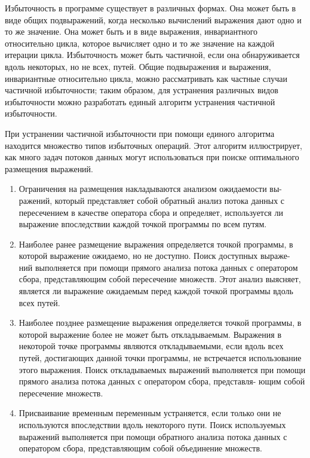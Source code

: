 
Избыточность в программе существует в различных формах. Она может быть в виде общих подвыражений, когда несколько вычислений выражения дают одно и то же значение. Она может быть и в виде выражения, инвариантного относительно цикла, которое вычисляет одно и то же значение на каждой итерации цикла. Избыточность может быть частичной, если она обнаруживается вдоль некоторых, но не всех, путей. Общие подвыражения и выражения, инвариантные относительно цикла, можно рассматривать как частные случаи частичной избыточности; таким образом, для устранения различных видов избыточности можно разработать единый алгоритм устранения частичной избыточности.

При устранении частичной избыточности при помощи единого алгоритма находится множество типов избыточных операций. Этот алгоритм иллюстрирует, как много задач потоков данных могут использоваться при поиске оптимального размещения выражений.

\begin{enumerate}
    \item Ограничения на размещения накладываются анализом ожидаемости вы- ражений, который представляет собой обратный анализ потока данных с пересечением в качестве оператора сбора и определяет, используется ли выражение впоследствии каждой точкой программы по всем путям.
    
    \item Наиболее ранее размещение выражения определяется точкой программы, в которой выражение ожидаемо, но не доступно. Поиск доступных выраже- ний выполняется при помощи прямого анализа потока данных с оператором сбора, представляющим собой пересечение множеств. Этот анализ выясняет, является ли выражение ожидаемым перед каждой точкой программы вдоль всех путей.
    
    \item Наиболее позднее размещение выражения определяется точкой программы, в которой выражение более не может быть откладываемым. Выражения в некоторой точке программы являются откладываемыми, если вдоль всех путей, достигающих данной точки программы, не встречается использование этого выражения. Поиск откладываемых выражений выполняется при помощи прямого анализа потока данных с оператором сбора, представля- ющим собой пересечение множеств.
    
    \item Присваивание временным переменным устраняется, если только они не используются впоследствии вдоль некоторого пути. Поиск используемых выражений выполняется при помощи обратного анализа потока данных с оператором сбора, представляющим собой объединение множеств.
\end{enumerate}

